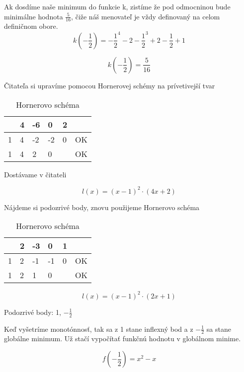 Ak dosdíme naše minimum do funkcie k, zistíme že pod odmocninou bude minimálne hodnota \(\frac{5}{16}\), čiže náš menovateľ je vždy definovaný na celom definičnom obore.
\begin{displaymath}
k(-\frac{1}{2})=-\frac{1}{2}^4 -2-\frac{1}{2}^3 + 2-\frac{1}{2} + 1
\end{displaymath}

\begin{displaymath}
k(-\frac{1}{2})=\frac{5}{16}
\end{displaymath}

Čitateľa si upravíme pomocou Hornerovej schémy na prívetivejší tvar

\begin{table}[htb]
\centering
\begin{tabular}{l||l|l|l|l|l}
	 & 4 & -6 &  0 & 2 &    \\ \hline\hline
   1 & 4 & -2 & -2 & 0 & OK \\ \hline
   1 & 4 &  2 &  0 &   & OK \\
\end{tabular}
\caption{Hornerovo schéma}
\end{table}

Dostávame v čitateli

\begin{displaymath}
l(x)=(x-1)^2\cdot (4x +2)
\end{displaymath}

Nájdeme si podozrivé body, znovu použijeme Hornerovo schéma

\begin{table}[htb]
\centering
\begin{tabular}{l||l|l|l|l|l}
	 & 2 & -3 &  0 & 1 &    \\ \hline\hline
   1 & 2 & -1 & -1 & 0 & OK \\ \hline
   1 & 2 &  1 &  0 &   & OK \\
\end{tabular}
\caption{Hornerovo schéma}
\end{table}

\begin{displaymath}
l(x)=(x-1)^2\cdot (2x +1)
\end{displaymath}

Podozrivé body: 1, \(-\frac{1}{2}\)

Keď vyšetríme monotónnosť, tak sa z 1 stane inflexný bod a z \(-\frac{1}{2}\) sa stane globálne minimum.
Už stačí vypočítať funkčnú hodnotu v globálnom minime.

\begin{displaymath}
f(-\frac{1}{2})= x^2 - x
\end{displaymath}

